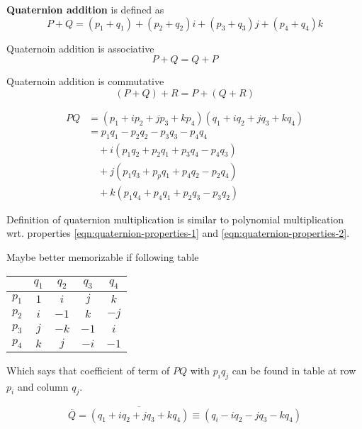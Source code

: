 \textbf{Quaternion addition} is defined as
$$P+Q = (p_1 + q_1) + (p_2 + q_2)i + (p_3 + q_3)j + (p_4+q_4)k$$

\begin{observation}
Quaternoin addition is associative
$$P+Q=Q+P$$ 
\end{observation}

\begin{observation}
Quaternoin addition is commutative
$$(P+Q)+R=P+(Q+R)$$ 
\end{observation}

\begin{definition}
\begin{align*}
PQ &= (p_1 + i p_2 + j p_3 + k p_4) (q_1 + i q_2 + j q_3 + k q_4) \\
&= p_1 q_1 - p_2 q_2 - p_3 q_3 - p_4 q_4 \\
& \quad + i (p_1 q_2 + p_2 q_1 + p_3 q_4 - p_4 q_3) \\
& \quad + j (p_1 q_3 + p_p q_1 + p_4 q_2 - p_2 q_4) \\
& \quad + k (p_1 q_4 + p_4 q_1 + p_2 q_3 - p_3 q_2)
\end{align*}
\end{definition}

Definition of quaternion multiplication is similar to polynomial multiplication wrt. properties \ref{eqn:quaternion-properties-1} and \ref{eqn:quaternion-properties-2}.

Maybe better memorizable if following table

\begin{center}
\begin{tabular}{c||c|c|c|c}
      & $q_1$ & $q_2$ & $q_3$ & $q_4$ \\
\hline \hline
$p_1$ & $1$   & $i$   & $j$   & $k$ \\
\hline
$p_2$ & $i$   & $-1$  & $k$   & $-j$ \\
\hline
$p_3$ & $j$   & $-k$  & $-1$  & $i$ \\
\hline
$p_4$ & $k$   & $j$   & $-i$  & $-1$
\end{tabular}
\end{center}

Which says that coefficient of term of $PQ$ with $p_i q_j$ can be found in table at row $p_i$ and column $q_j$.

\begin{definition}
$$\overline{Q} = \overline{(q_1 + i q_2 + j q_3 + k q_4)} \equiv (q_i - i q_2 - j q_3 - k q_4)$$
\end{definition}

